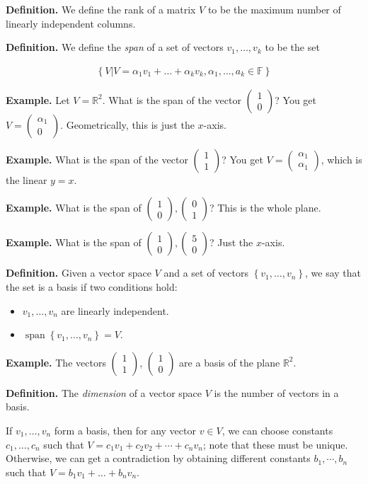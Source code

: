 \documentclass{article}
\newcommand{\mat}[1]{\begin{pmatrix}#1\end{pmatrix}}
\DeclareMathOperator{\Span}{span}
\begin{document}
{\bf Definition.} We define the rank of a matrix $V$ to be the maximum number of linearly independent columns.

{\bf Definition.} We define the {\it span} of a set of vectors $v_1, \dots, v_k$ to be the set

\begin{align*}
  \left\{ V | V = \alpha_1 v_1 + \dots + \alpha_k v_k, \alpha_1, \dots, a_k \in \mathbb{F} \right\}
\end{align*}

{\bf Example.} Let $V = \mathbb{R}^2$.  What is the span of the vector $\mat{1 \\ 0}$?  You get $V = \mat{\alpha_1 \\ 0}$.  Geometrically, this is just the $x$-axis.

{\bf Example.} What is the span of the vector $\mat{1 \\ 1}$?  You get $V = \mat{\alpha_1 \\ \alpha_1}$, which is the linear $y = x$.

{\bf Example.} What is the span of $\mat{1 \\ 0}, \mat{0 \\ 1}$?  This is the whole plane.

{\bf Example.} What is the span of $\mat{1 \\ 0}, \mat{5 \\ 0}$?  Just the $x$-axis.

{\bf Definition.} Given a vector space $V$ and a set of vectors $ \left\{ v_1, \dots, v_n \right\}$, we say that the set is a basis if two conditions hold:

\begin{itemize}
  \item $v_1, \dots, v_n$ are linearly independent.
  \item $\Span \left\{ v_1, \dots, v_n \right\} = V$.
\end{itemize}

{\bf Example.} The vectors $\mat{1 \\ 1}$, $\mat{1 \\ 0}$ are a basis of the plane $\mathbb{R}^2$.

{\bf Definition.} The {\it dimension} of a vector space $V$ is the number of vectors in a basis.

If $v_1, \dots, v_n$ form a basis, then for any vector $v \in V$, we can choose constants $c_1, \dots, c_n$ such that $V = c_1 v_1 + c_2 v_2 + \cdots + c_n v_n$; note that these must be unique.  Otherwise, we can get a contradiction by obtaining different constants $b_1, \cdots, b_n$ such that $V = b_1 v_1 + \dots + b_n v_n$.
\end{document}
